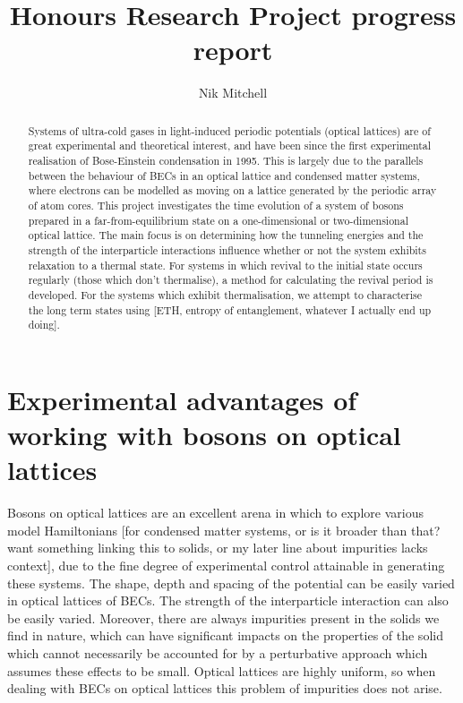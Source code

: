 \documentclass[a4paper,10pt]{article}
\title{Honours Research Project progress report}
\author{Nik Mitchell}
\begin{document}
\maketitle

\begin{abstract}

Systems of ultra-cold gases in light-induced periodic potentials (optical lattices) are of great experimental and theoretical interest, and have been since the first experimental 
realisation of Bose-Einstein condensation in 1995. 
This is largely due to the parallels between the behaviour of BECs in an optical lattice and condensed matter systems, where 
electrons can be modelled as moving on a lattice generated by the periodic array of atom cores\cite{Bloch2012}. This project 
investigates the time evolution of a system of bosons prepared in a far-from-equilibrium state on a one-dimensional or two-dimensional
optical lattice. The main focus is on determining how the tunneling energies and the strength of the interparticle interactions influence
whether or not the system exhibits relaxation to a thermal state. For systems in which revival to the initial state occurs regularly (those which don't thermalise), 
a method for calculating the revival period is developed. For the systems which exhibit thermalisation, we attempt to characterise the long term
states using [ETH, entropy of entanglement, whatever I actually end up doing].



\end{abstract}
\newpage
\section{Experimental advantages of working with bosons on optical lattices}
Bosons on optical lattices are an excellent arena in which to explore various model Hamiltonians [for condensed matter systems, or is it broader than that?
want something linking this to solids, or my later line about impurities lacks context], due to the 
fine degree of experimental control attainable in generating these systems.
The shape, depth and spacing of the potential can be easily varied in optical lattices of BECs\cite{Morsch2006}. 
The strength of the interparticle interaction can also be easily varied. 
Moreover, there are always impurities present in the solids we find in nature,
which can have significant impacts on the properties of the solid which cannot necessarily be accounted for by a perturbative approach which assumes these effects 
to be small. Optical lattices are highly uniform, so when dealing with BECs on optical lattices this problem of impurities does not arise.
\end{document}
